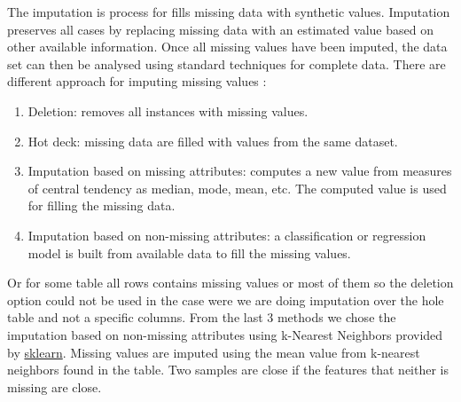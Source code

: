 \documentclass{article}
\begin{document}
\noindent
The imputation is process for fills missing data with synthetic values.
Imputation preserves all cases by replacing missing data with an estimated value based on other available information.
Once all missing values have been imputed, the data set can then be analysed using standard techniques for complete data.
There are different approach for imputing missing values \cite{corr_lede}:
\begin{enumerate}
    \item Deletion: removes all instances with missing values.
    \item Hot deck: missing data are filled with values from the same dataset.
    \item Imputation based on missing attributes: computes a new value from measures of central tendency as median, mode, mean,
          etc. The computed value is used for filling the missing data.
    \item Imputation based on non-missing attributes: a classification or regression model is built from available data to fill the missing values.
\end{enumerate}
Or for some table all rows contains missing values or most of them so the deletion option could not be used in the case were we are doing imputation over the hole table and not a specific columns.
From the last 3 methods we chose the imputation based on non-missing attributes using k-Nearest Neighbors provided by \href{https://scikit-learn.org/stable/modules/generated/sklearn.impute.KNNImputer.html}{sklearn}.
Missing values are imputed using the mean value from k-nearest neighbors found in the table. Two samples are close if the features that neither is missing are close.
\end{document}
